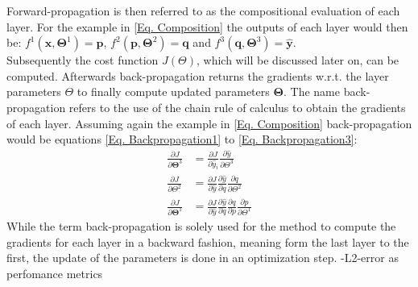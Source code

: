 \noindent
Forward-propagation is then referred to as the compositional evaluation of each layer. For the example in \cref{Eq. Composition} the outputs of each layer would then be:  \(f^1(\mathbf{x},\mathbf{\Theta}^1) = \mathbf{p}\), \(f^2(\mathbf{p},\mathbf{\Theta}^2) = \mathbf{q}\) and \(f^3(\mathbf{q},\mathbf{\Theta}^3) = \mathbf{\hat{y}}\).\\
Subsequently the cost function \(J(\Theta)\), which will be discussed later on, can be computed. Afterwards back-propagation returns the gradients w.r.t. the layer parameters \(\Theta\) to finally compute updated parameters \(\mathbf{\Theta}\).  The name back-propagation refers to the use of the chain rule of calculus to obtain the gradients of each layer. Assuming again the example in \cref{Eq. Composition} back-propagation would be equations \cref{Eq. Backpropagation1} to \cref{Eq. Backpropagation3}:
\begin{align}
	\frac{\partial J}{\partial \mathbf{\Theta}^3} &= \frac{\partial J}{\partial\hat{y}_i}\frac{\partial\hat{y}}{\partial \Theta^3}
\label{Eq. Backpropagation3}\\
	\frac{\partial J}{\partial \Theta^2} &= \frac{\partial J}{\partial\hat{y}}\frac{\partial\hat{y}}{\partial q}\frac{\partial q}{\partial \Theta^2}
\label{Eq. Backpropagation2}\\
	\frac{\partial J}{\partial \mathbf{\Theta}^1} &= \frac{\partial J}{\partial\hat{y}}\frac{\partial\hat{y}}{\partial q}\frac{\partial q}{\partial p}\frac{\partial p}{\partial \Theta^1}
\label{Eq. Backpropagation1}
\end{align}
While the term back-propagation is solely used for the method to compute the gradients for each layer in a backward fashion, meaning form the last layer to the first, the update of the parameters is done in an optimization step.
-L2-error as perfomance metrics

